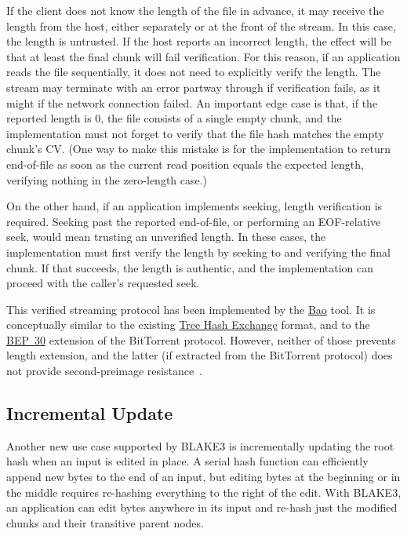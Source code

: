 \documentclass[11pt,notitlepage,a4paper]{article}
\begin{document}
If the client does not know the length of the file in advance, it may receive
the length from the host, either separately or at the front of the stream. In
this case, the length is untrusted. If the host reports an incorrect length,
the effect will be that at least the final chunk will fail verification. For
this reason, if an application reads the file sequentially, it does not need to
explicitly verify the length. The stream may terminate with an error partway
through if verification fails, as it might if the network connection failed. An
important edge case is that, if the reported length is 0, the file consists of
a single empty chunk, and the implementation must not forget to verify that the
file hash matches the empty chunk's CV. (One way to make this mistake is for
the implementation to return end-of-file as soon as the current read position
equals the expected length, verifying nothing in the zero-length case.)

On the other hand, if an application implements seeking, length verification is
required. Seeking past the reported end-of-file, or performing an EOF-relative
seek, would mean trusting an unverified length. In these cases, the
implementation must first verify the length by seeking to and verifying the
final chunk. If that succeeds, the length is authentic, and the implementation
can proceed with the caller's requested seek.

This verified streaming protocol has been implemented by the
\href{https://github.com/oconnor663/bao}{Bao} tool. It is conceptually similar
to the existing
\href{https://adc.sourceforge.io/draft-jchapweske-thex-02.html}{Tree Hash
Exchange} format, and to the
\href{https://www.bittorrent.org/beps/bep_0030.html}{BEP~30} extension of the
BitTorrent protocol. However, neither of those prevents length extension, and
the latter (if extracted from the BitTorrent protocol) does not provide
second-preimage resistance~\cite[\S8.5]{DBLP:journals/tosc/DaemenMA18}.

\subsection{Incremental Update}\label{sec:incrementalupdate}

Another new use case supported by BLAKE3 is incrementally updating the root
hash when an input is edited in place. A serial hash function can efficiently
append new bytes to the end of an input, but editing bytes at the beginning or
in the middle requires re-hashing everything to the right of the edit. With
BLAKE3, an application can edit bytes anywhere in its input and re-hash just
the modified chunks and their transitive parent nodes.
\end{document}
